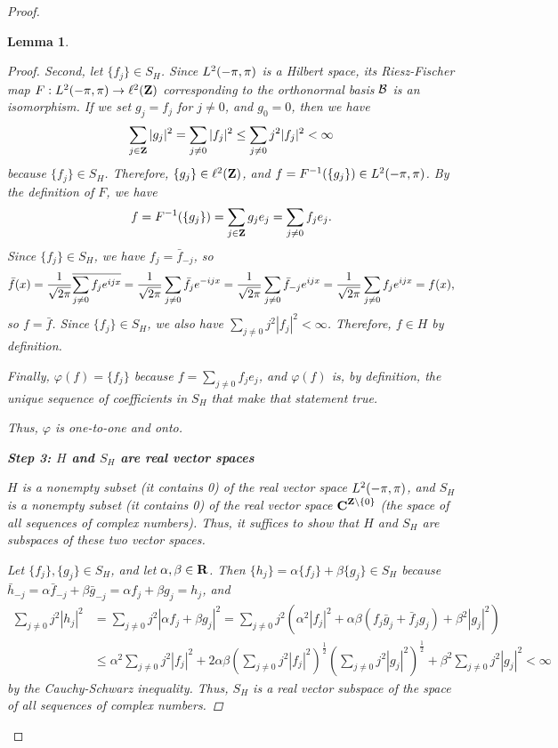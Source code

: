 \documentclass{homework}
\newtheorem{lemma}{Lemma}
\begin{document}
\begin{arabicparts}
\begin{proof}
\begin{lemma}
\begin{proof}
			Second, let $\{f_j\} \in S_H$. Since $L^2(-\pi,\pi)$ is a Hilbert space, its Riesz-Fischer map $F: L^2(-\pi,\pi) \to \ell^2(\textbf{Z})$ corresponding to the orthonormal basis $\mathcal{B}$ is an isomorphism. If we set $g_j = f_j$ for $j \ne 0$, and $g_0 = 0$, then we have
			\begin{equation}
				\sum_{j\in\textbf{Z}}|g_j|^2 = \sum_{j\ne 0}|f_j|^2 \le \sum_{j\ne 0}j^2|f_j|^2 < \infty
			\end{equation}
			because $\{f_j\} \in S_H$. Therefore, $\{g_j\} \in \ell^2(\textbf{Z})$, and $f = F^{-1}(\{g_j\}) \in L^2(-\pi,\pi)$. By the definition of $F$, we have
			\begin{equation}
				f = F^{-1}(\{g_j\}) = \sum_{j\in\textbf{Z}}g_je_j = \sum_{j\ne 0}f_je_j.
			\end{equation}
			Since $\{f_j\} \in S_H$, we have $f_j = \bar{f}_{-j}$, so
			\begin{equation}
				\bar{f}(x) = \frac{1}{\sqrt{2\pi}}\overline{\sum_{j\ne0}f_je^{ijx}} = \frac{1}{\sqrt{2\pi}}\sum_{j\ne0}\bar{f}_je^{-ijx} = \frac{1}{\sqrt{2\pi}}\sum_{j\ne0}\bar{f}_{-j}e^{ijx} = \frac{1}{\sqrt{2\pi}}\sum_{j\ne0}f_je^{ijx} = f(x),
			\end{equation}
			so $f = \bar{f}$. Since $\{f_j\}\in S_H$, we also have $\sum\limits_{j\ne0}j^2|f_j|^2 < \infty$. Therefore, $f \in H$ by definition.
			
			Finally, $\varphi(f) = \{f_j\}$ because $f = \sum\limits_{j\ne 0}f_je_j$, and $\varphi(f)$ is, by definition, the unique sequence of coefficients in $S_H$ that make that statement true. 
			
			Thus, $\varphi$ is one-to-one and onto.
			
			\textbf{Step 3: $H$ and $S_H$ are real vector spaces}
			
			$H$ is a nonempty subset (it contains 0) of the real vector space $L^2(-\pi,\pi)$, and $S_H$ is a nonempty subset (it contains 0) of the real vector space $\textbf{C}^{\textbf{Z} \setminus \{0\}}$ (the space of all sequences of complex numbers). Thus, it suffices to show that $H$ and $S_H$ are subspaces of these two vector spaces. 
			
			Let $\{f_j\}, \{g_j\} \in S_H$, and let $\alpha,\beta\in\textbf{R}$. Then $\{h_j\} = \alpha\{f_j\} + \beta\{g_j\} \in S_H$ because $\bar{h}_{-j} = \alpha\bar{f}_{-j} + \beta\bar{g}_{-j} = \alpha f_j + \beta g_j = h_j$, and
			\begin{align}
				\sum_{j\ne 0}j^2|h_j|^2 &= \sum_{j\ne0}j^2|\alpha f_j +\beta g_j|^2 = \sum_{j\ne 0}j^2(\alpha^2|f_j|^2 + \alpha\beta(f_j\bar{g}_j + \bar{f}_jg_j) +\beta^2|g_j|^2)\\
				&\le \alpha^2\sum_{j\ne 0}j^2|f_j|^2 + 2\alpha\beta\left(\sum_{j\ne0}j^2|f_j|^2\right)^\frac{1}{2}\left(\sum_{j\ne0}j^2|g_j|^2\right)^\frac{1}{2} + \beta^2\sum_{j\ne0}j^2|g_j|^2 < \infty
			\end{align}
			by the Cauchy-Schwarz inequality. Thus, $S_H$ is a real vector subspace of the space of all sequences of complex numbers.
			

\end{proof}
\end{lemma}
\end{proof}
\end{arabicparts}
\end{document}
